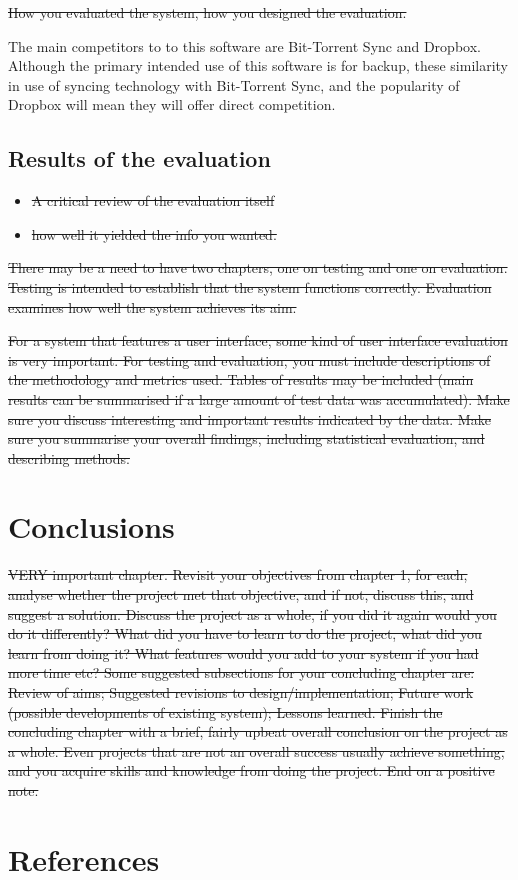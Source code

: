 \documentclass[12pt,a4paper,]{adreport}
\begin{document}
\sout{How you evaluated the system, how you designed the evaluation.}

The main competitors to to this software are Bit-Torrent Sync and
Dropbox. Although the primary intended use of this software is for
backup, these similarity in use of syncing technology with Bit-Torrent
Sync, and the popularity of Dropbox will mean they will offer direct
competition.

\section{Results of the evaluation}\label{results-of-the-evaluation}

\begin{itemize}
\itemsep1pt\parskip0pt
\item
  \sout{A critical review of the evaluation itself}
\item
  \sout{how well it yielded the info you wanted.}
\end{itemize}

\sout{There may be a need to have two chapters, one on testing and one
on evaluation. Testing is intended to establish that the system
functions correctly. Evaluation examines how well the system achieves
its aim.}

\sout{For a system that features a user interface, some kind of user
interface evaluation is very important. For testing and evaluation, you
must include descriptions of the methodology and metrics used. Tables of
results may be included (main results can be summarised if a large
amount of test data was accumulated). Make sure you discuss interesting
and important results indicated by the data. Make sure you summarise
your overall findings, including statistical evaluation, and describing
methods.}

\chapter{Conclusions}\label{conclusions}

\sout{VERY important chapter. Revisit your objectives from chapter 1,
for each, analyse whether the project met that objective, and if not,
discuss this, and suggest a solution. Discuss the project as a whole, if
you did it again would you do it differently? What did you have to learn
to do the project, what did you learn from doing it? What features would
you add to your system if you had more time etc? Some suggested
subsections for your concluding chapter are: Review of aims; Suggested
revisions to design/implementation; Future work (possible developments
of existing system); Lessons learned. Finish the concluding chapter with
a brief, fairly upbeat overall conclusion on the project as a whole.
Even projects that are not an overall success usually achieve something,
and you acquire skills and knowledge from doing the project. End on a
positive note.}

\chapter{References}\label{references}
\end{document}
